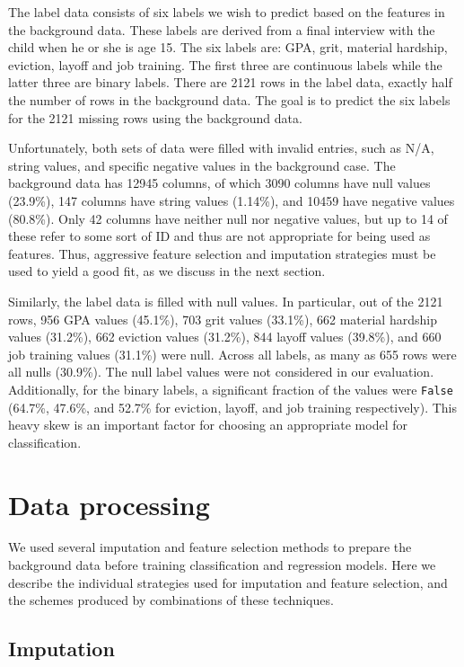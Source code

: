 \documentclass{article} %
\begin{document}
The label data consists of six labels we wish to predict based on the features in the background data. These labels are derived from a final interview with the child when he or she is age 15. The six labels are: GPA, grit, material hardship, eviction, layoff and job training. The first three are continuous labels while the latter three are binary labels. There are 2121 rows in the label data, exactly half the number of rows in the background data. The goal is to predict the six labels for the 2121 missing rows using the background data.

Unfortunately, both sets of data were filled with invalid entries, such as N/A, string values, and specific negative values in the background case. The background data has 12945 columns, of which 3090 columns have null values (23.9\%), 147 columns have string values (1.14\%), and 10459 have negative values (80.8\%). Only 42 columns have neither null nor negative values, but up to 14 of these refer to some sort of ID and thus are not appropriate for being used as features. Thus, aggressive feature selection and imputation strategies must be used to yield a good fit, as we discuss in the next section. 

Similarly, the label data is filled with null values. In particular, out of the 2121 rows, 956 GPA values (45.1\%), 703 grit values (33.1\%), 662 material hardship values (31.2\%), 662 eviction values (31.2\%), 844 layoff values (39.8\%), and 660 job training values (31.1\%) were null. Across all labels, as many as 655 rows were all nulls (30.9\%). The null label values were not considered in our evaluation. Additionally, for the binary labels, a significant fraction of the values were \texttt{False} (64.7\%, 47.6\%, and 52.7\% for eviction, layoff, and job training respectively). This heavy skew is an important factor for choosing an appropriate model for classification.

\section{Data processing}
\label{sec:datapreprocessing}

We used several imputation and feature selection methods to prepare the background data before training classification and regression models. Here we describe the individual strategies used for imputation and feature selection, and the schemes produced by combinations of these techniques.

\subsection{Imputation}
\label{sec:imputation}
\end{document}
